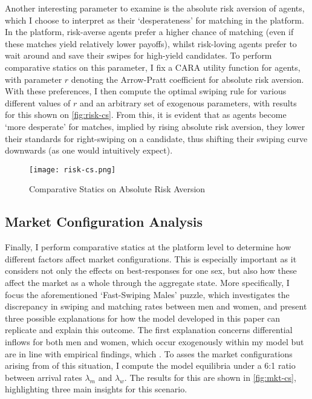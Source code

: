 
Another interesting parameter to examine is the absolute risk aversion of agents, which I choose to interpret as their `desperateness' for matching in the platform. In the platform, risk-averse agents prefer a higher chance of matching (even if these matches yield relatively lower payoffs), whilst risk-loving agents prefer to wait around and save their swipes for high-yield candidates. To perform comparative statics on this parameter, I fix a CARA utility function for agents, with parameter $r$ denoting the Arrow-Pratt coefficient for absolute risk aversion. With these preferences, I then compute the optimal swiping rule for various different values of $r$ and an arbitrary set of exogenous parameters, with results for this shown on \autoref{fig:risk-cs}. From this, it is evident that as agents become `more desperate' for matches, implied by rising absolute risk aversion, they lower their standards for right-swiping on a candidate, thus shifting their swiping curve downwards (as one would intuitively expect).

\begin{figure}[ht]
    \centering
    \caption{Comparative Statics on Absolute Risk Aversion}
    \texttt{[image: risk-cs.png]}
    \label{fig:risk-cs} 
\end{figure}

\subsection{Market Configuration Analysis}\label{sec:section3.3} 
Finally, I perform comparative statics at the platform level to determine how different factors affect market configurations. This is especially important as it considers not only the effects on best-responses for one sex, but also how these affect the market as a whole through the aggregate state. More specifically, I focus the aforementioned `Fast-Swiping Males' puzzle, which investigates the discrepancy in swiping and matching rates between men and women, and present three possible explanations for how the model developed in this paper can replicate and explain this outcome. The first explanation concerns differential inflows for both men and women, which occur exogenously within my model but are in line with empirical findings, which . To asses the market configurations arising from of this situation, I compute the model equilibria under a 6:1 ratio between arrival rates $\lambda_m$ and $\lambda_w$. The results for this are shown in \autoref{fig:mkt-cs}, highlighting three main insights for this scenario. 

